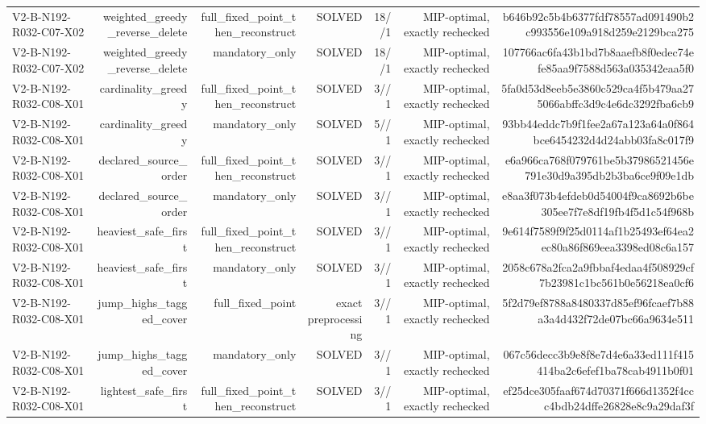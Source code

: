 {\begin{longtable}{lrrrrrr}
V2-B-N192-R032-C07-X02 & weighted\_greedy\_reverse\_delete & full\_fixed\_point\_then\_reconstruct & SOLVED & 18//1 & MIP-optimal, exactly rechecked & b646b92c5b4b6377fdf78557ad091490b2c993556e109a918d259e2129bca275 \\
V2-B-N192-R032-C07-X02 & weighted\_greedy\_reverse\_delete & mandatory\_only & SOLVED & 18//1 & MIP-optimal, exactly rechecked & 107766ac6fa43b1bd7b8aaefb8f0edec74efe85aa9f7588d563a035342eaa5f0 \\
V2-B-N192-R032-C08-X01 & cardinality\_greedy & full\_fixed\_point\_then\_reconstruct & SOLVED & 3//1 & MIP-optimal, exactly rechecked & 5fa0d53d8eeb5e3860c529ca4f5b479aa275066abffc3d9c4e6dc3292fba6cb9 \\
V2-B-N192-R032-C08-X01 & cardinality\_greedy & mandatory\_only & SOLVED & 5//1 & MIP-optimal, exactly rechecked & 93bb44eddc7b9f1fee2a67a123a64a0f864bce6454232d4d24abb03fa8c017f9 \\
V2-B-N192-R032-C08-X01 & declared\_source\_order & full\_fixed\_point\_then\_reconstruct & SOLVED & 3//1 & MIP-optimal, exactly rechecked & e6a966ca768f079761be5b37986521456e791e30d9a395db2b3ba6ce9f09e1db \\
V2-B-N192-R032-C08-X01 & declared\_source\_order & mandatory\_only & SOLVED & 3//1 & MIP-optimal, exactly rechecked & e8aa3f073b4efdeb0d54004f9ca8692b6be305ee7f7e8df19fb4f5d1c54f968b \\
V2-B-N192-R032-C08-X01 & heaviest\_safe\_first & full\_fixed\_point\_then\_reconstruct & SOLVED & 3//1 & MIP-optimal, exactly rechecked & 9e614f7589f9f25d0114af1b25493ef64ea2ec80a86f869eea3398ed08c6a157 \\
V2-B-N192-R032-C08-X01 & heaviest\_safe\_first & mandatory\_only & SOLVED & 3//1 & MIP-optimal, exactly rechecked & 2058c678a2fca2a9fbbaf4edaa4f508929cf7b23981c1bc561b0e56218ea0cf6 \\
V2-B-N192-R032-C08-X01 & jump\_highs\_tagged\_cover & full\_fixed\_point & exact preprocessing & 3//1 & MIP-optimal, exactly rechecked & 5f2d79ef8788a8480337d85ef96fcaef7b88a3a4d432f72de07bc66a9634e511 \\
V2-B-N192-R032-C08-X01 & jump\_highs\_tagged\_cover & mandatory\_only & SOLVED & 3//1 & MIP-optimal, exactly rechecked & 067c56decc3b9e8f8e7d4e6a33ed111f415414ba2c6efef1ba78cab4911b0f01 \\
V2-B-N192-R032-C08-X01 & lightest\_safe\_first & full\_fixed\_point\_then\_reconstruct & SOLVED & 3//1 & MIP-optimal, exactly rechecked & ef25dce305faaf674d70371f666d1352f4ccc4bdb24dffe26828e8c9a29daf3f \\

\end{longtable}}
